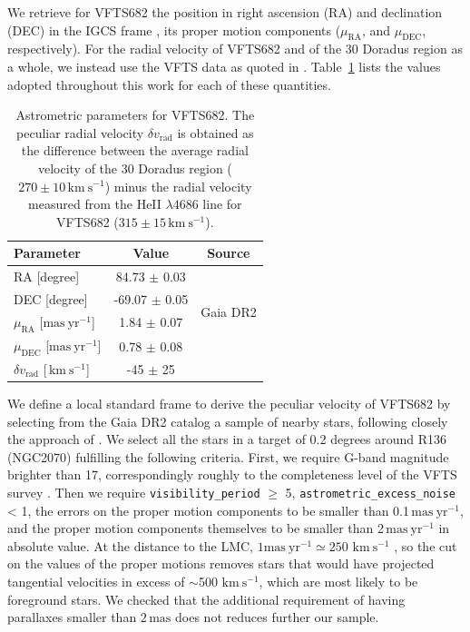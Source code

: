 \documentclass{aa}
\newcommand{\kms}{{\,\mathrm{km\ s^{-1}}}}
\DeclareRobustCommand{\Tabref}[1]{Table~\ref{#1}}
\begin{document}

We retrieve for VFTS682 the position in right ascension (RA) and declination (DEC)
in the IGCS frame \cite[][]{brown:18}, its
proper motion components ($\mu_\mathrm{RA}$, and $\mu_\mathrm{DEC}$,
respectively). For the radial velocity of VFTS682 and of the 30 Doradus
region as a whole, we instead use the VFTS data
as quoted in \cite{bestenlehner:11}. \Tabref{tab:vfts682} lists the values adopted throughout
this work for each of these quantities.

\begin{table}[tbp]
  \centering
    \caption{Astrometric parameters for VFTS682. The peculiar radial
    velocity $\delta v_\mathrm{rad}$ is obtained as the difference
    between the average radial velocity of the 30 Doradus region
    ($270\pm10\kms$) minus the radial velocity measured from the HeII $\lambda4686$
    line for VFTS682 ($315\pm15\kms$).}

  \begin{tabular}[htbp]{l|c|c}
    Parameter & Value & Source\\ \hline\hline
    RA \hfill[degree] &  \phantom{-}84.73 $\pm$  0.03 & \multirow{4}{*}{Gaia DR2}\\
    DEC \hfill [degree] & -69.07 $\pm$  0.05  & \\
    $\mu_\mathrm{RA}$  \hfill[$\mathrm{mas\ yr^{-1}}$] & \phantom{-0}1.84 $\pm$ 0.07 & \\
    $\mu_\mathrm{DEC}$  \hfill[$\mathrm{mas\ yr^{-1}}$] & \phantom{-0}0.78 $\pm$ 0.08& \\
    $\delta v_\mathrm{rad}$  \hfill[$\kms$] & \phantom{0}-45 $\pm$ 25 & \cite{bestenlehner:11}\\
    \hline
  \end{tabular}
  \label{tab:vfts682}
\end{table}

We define a local standard frame to derive the peculiar velocity
of VFTS682 by selecting from the Gaia DR2 catalog a sample of nearby
stars, following closely the approach of \cite{lennon:18}.
We select all the stars in a target of 0.2 degrees around R136
(NGC2070) fulfilling the following criteria. First, we require G-band
magnitude brighter than 17, correspondingly roughly to the
completeness level of the VFTS survey \citep[here we implicitly assume
G$\sim$V,][]{evans:11}. Then we require \texttt{visibility\_period} $\geq$ 5,
\texttt{astrometric\_excess\_noise} < 1, the errors on the proper
motion components to be smaller than 0.1\,$\mathrm{mas\ yr^{-1}}$,
and the proper motion components themselves to be smaller than
2\,$\mathrm{mas\ yr^{-1}}$ in absolute value. At the distance to the
LMC, $1\mathrm{mas\ yr^{-1}}\simeq250\,\kms$ \citep[e.g.,][]{lennon:18}, so the cut on the values
of the proper motions removes stars that would have projected
tangential velocities in excess of $\sim$500\,$\kms$, which are most
likely to be foreground stars. We checked that the additional
requirement of having parallaxes smaller than $2\,\mathrm{mas}$ does
not reduces further our sample. 
\end{document}
